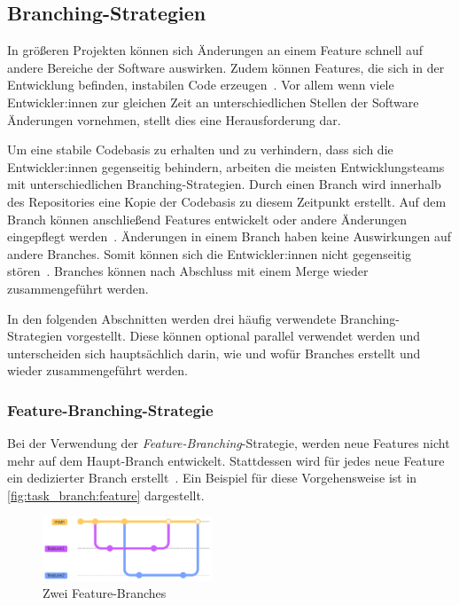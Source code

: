 
\subsection{Branching-Strategien}
\label{sec:workflows:branching}

In größeren Projekten können sich Änderungen an einem Feature schnell auf andere Bereiche der Software auswirken. Zudem können Features, die sich in der Entwicklung befinden, instabilen Code erzeugen~\cite{sorin_dumitrescu_what_2021}. Vor allem wenn viele Entwickler:innen zur gleichen Zeit an unterschiedlichen Stellen der Software Änderungen vornehmen, stellt dies eine Herausforderung dar.

Um eine stabile Codebasis zu erhalten und zu verhindern, dass sich die Entwickler:innen gegenseitig behindern, arbeiten die meisten Entwicklungsteams mit unterschiedlichen Branching\hyp Strategien. Durch einen Branch wird innerhalb des Repositories eine Kopie der Codebasis zu diesem Zeitpunkt erstellt. Auf dem Branch können anschließend Features entwickelt oder andere Änderungen eingepflegt werden~\cite{atlassian_hintergrundwissen_2023}. Änderungen in einem Branch haben keine Auswirkungen auf andere Branches. Somit können sich die Entwickler:innen nicht gegenseitig stören~\cite{atlassian_hintergrundwissen_2023}. Branches können nach Abschluss mit einem Merge wieder zusammengeführt werden.

In den folgenden Abschnitten werden drei häufig verwendete Branching\hyp Strategien vorgestellt. Diese können optional parallel verwendet werden und unterscheiden sich hauptsächlich darin, wie und wofür Branches erstellt und wieder zusammengeführt werden.


\subsubsection{Feature\hyp Branching\hyp Strategie}

Bei der Verwendung der \emph{Feature\hyp Branching}\hyp Strategie, werden neue Features nicht mehr auf dem Haupt\hyp Branch entwickelt. Stattdessen wird für jedes neue Feature ein dedizierter Branch erstellt~\cite{atlassian_feature_2023}. Ein Beispiel für diese Vorgehensweise ist in \autoref{fig:task_branch:feature} dargestellt.

\begin{figure}
    \includegraphics[width=0.45\textwidth]{src/assets/diagrams/task_branch/feature-branch.pdf}
    \caption{Zwei Feature\hyp Branches}
    \label{fig:task_branch:feature}
\end{figure}

